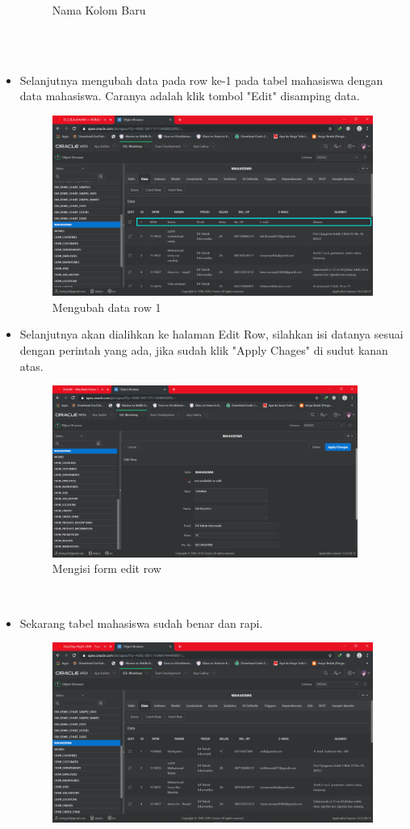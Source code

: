 \documentclass[12pt, times new roman]{article}
\begin{document}
\begin{itemize}
\begin{figure}[htbp]
	\caption{Nama Kolom Baru}
\end{figure}\\
\\
\item Selanjutnya mengubah data pada row ke-1 pada tabel mahasiswa dengan data mahasiswa. Caranya adalah klik tombol "Edit" disamping data.
\begin{figure}[htbp]
	\centering
	\includegraphics[width=10.5cm]{figures/19.png}
	\caption{Mengubah data row 1}
\end{figure}
\item Selanjutnya akan dialihkan ke halaman Edit Row, silahkan isi datanya sesuai dengan perintah yang ada, jika sudah klik "Apply Chages" di sudut kanan atas.
\begin{figure}[htbp]
	\centering
	\includegraphics[width=10cm]{figures/20.png}
	\caption{Mengisi form edit row}
\end{figure}\\
\item Sekarang tabel mahasiswa sudah benar dan rapi.
\begin{figure}[htbp]
	\centering
	\includegraphics[width=10.5cm]{figures/21.png}

\end{figure}
\end{itemize}
\end{document}
